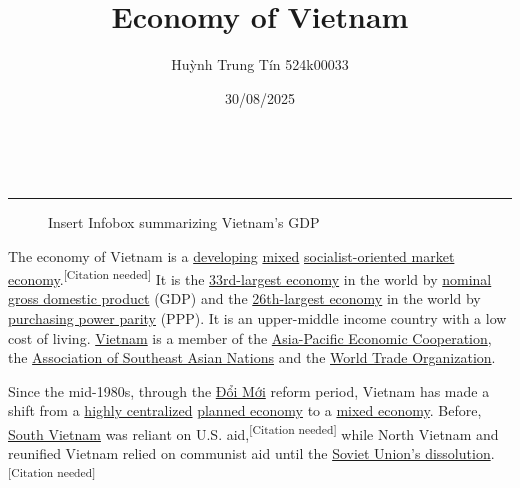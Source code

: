 \documentclass{article}
\title{Economy of Vietnam}
\author{Huỳnh Trung Tín 524k00033}
\date{30/08/2025}
\begin{document}
\noindent\parbox{\linewidth}{
\parbox{.4\linewidth}{\fontsize{14.4}{20}\selectfont\thetitle}\hfill
\parbox{.4\linewidth}{\fontsize{12}{14}\selectfont\raggedleft\thedate\\\theauthor%
}}
\par\noindent\rule[-5pt]{\textwidth}{0.1pt}

\begin{figure}
    \begin{framed}
    Insert Infobox summarizing Vietnam's GDP
    \end{framed}
\end{figure}

The economy of Vietnam is a \href{https://en.wikipedia.org/wiki/Developing_economy}{developing} \href{https://en.wikipedia.org/wiki/Mixed_economy}{mixed} \href{https://en.wikipedia.org/wiki/Socialist-oriented_market_economy}{socialist-oriented market economy}.\textsuperscript{[Citation needed]} It is the \href{https://en.wikipedia.org/wiki/List_of_countries_by_GDP_(nominal)}{33rd-largest economy} in the world by \href{https://en.wikipedia.org/wiki/Nominal_gross_domestic_product}{nominal gross domestic product} (GDP) and the \href{https://en.wikipedia.org/wiki/List_of_countries_by_GDP_(PPP)}{26th-largest economy} in the world by \href{https://en.wikipedia.org/wiki/Purchasing_power_parity}{purchasing power parity} (PPP). It is an upper-middle income country with a low cost of living. \href{https://en.wikipedia.org/wiki/Vietnam}{Vietnam} is a member of the \href{https://en.wikipedia.org/wiki/Asia-Pacific_Economic_Cooperation}{Asia-Pacific Economic Cooperation}, the \href{https://en.wikipedia.org/wiki/Association_of_Southeast_Asian_Nations}{Association of Southeast Asian Nations} and the \href{https://en.wikipedia.org/wiki/World_Trade_Organization}{World Trade Organization}.

Since the mid-1980s, through the \href{https://en.wikipedia.org/wiki/%C4%90%E1%BB%95i_M%E1%BB%9Bi}{Đổi Mới} reform period, Vietnam has made a shift from a \href{https://en.wikipedia.org/wiki/Centralization}{highly centralized} \href{https://en.wikipedia.org/wiki/Planned_economy}{planned economy} to a \href{https://en.wikipedia.org/wiki/Mixed_economy}{mixed economy}. Before, \href{https://en.wikipedia.org/wiki/North_Vietnam}{South Vietnam} was reliant on U.S. aid,\textsuperscript{[Citation needed]} while North Vietnam and reunified Vietnam relied on communist aid until the \href{https://en.wikipedia.org/wiki/Dissolution_of_the_Soviet_Union}{Soviet Union's dissolution}.\textsuperscript{[Citation needed]}
\end{document}
